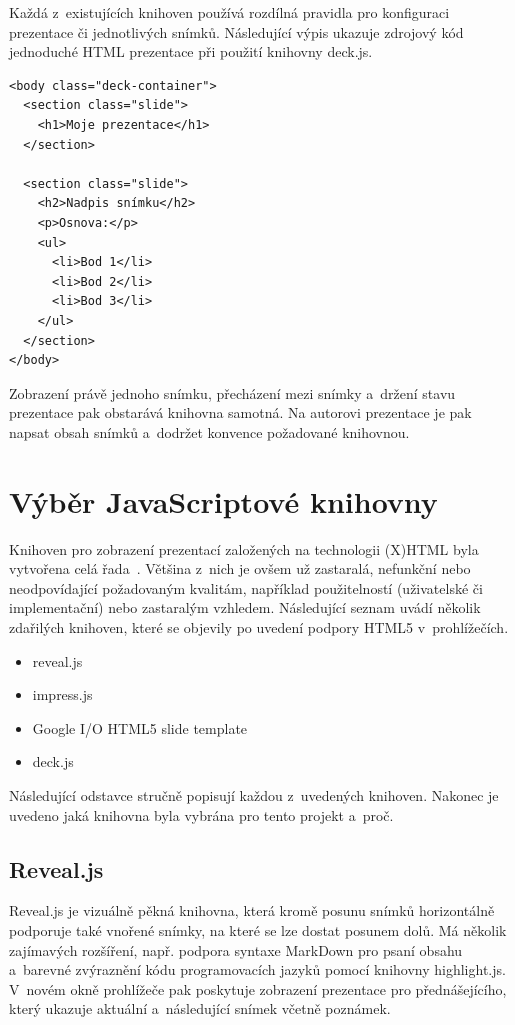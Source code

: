 \documentclass[11pt,twoside,a4paper]{book}
\begin{document}
Každá z~existujících knihoven používá rozdílná pravidla pro konfiguraci prezentace či jednotlivých snímků. Následující výpis ukazuje zdrojový kód jednoduché HTML prezentace při použití knihovny deck.js.

\begin{lstlisting}[caption=Ukázka zdrojového kódu HTML prezentace (deck.js),captionpos=b]
<body class="deck-container">
  <section class="slide">
    <h1>Moje prezentace</h1>
  </section>

  <section class="slide">
    <h2>Nadpis snímku</h2>
    <p>Osnova:</p>
    <ul>
      <li>Bod 1</li>
      <li>Bod 2</li>
      <li>Bod 3</li>
    </ul>
  </section>
</body>
\end{lstlisting}

Zobrazení právě jednoho snímku, přecházení mezi snímky a~držení stavu prezentace pak obstarává knihovna samotná. Na autorovi prezentace je pak napsat obsah snímků a~dodržet konvence požadované knihovnou.


\section{Výběr Java\-Scriptové knihovny}
Knihoven pro zobrazení prezentací založených na technologii (X)HTML byla vytvořena celá řada~\cite{htmlslideshowweb}. Většina z~nich je ovšem už zastaralá, nefunkční nebo neodpovídající požadovaným kvalitám, například použitelností (uživatelské či imple\-mentační) nebo zastaralým vzhledem. Následující seznam uvádí několik zdařilých knihoven, které se objevily po uvedení podpory HTML5 v~prohlížečích.

\begin{itemize}
	\item reveal.js
	\item impress.js
	\item Google I/O HTML5 slide template
	\item deck.js
\end{itemize}

Následující odstavce stručně popisují každou z~uvedených knihoven. Nakonec je uvedeno jaká knihovna byla vybrána pro tento projekt a~proč.

\subsection{Reveal.js} \label{chap:revealjs}
Reveal.js \cite{revealjs} je vizuálně pěkná knihovna, která kromě posunu snímků horizontálně podporuje také vnořené snímky, na které se lze dostat posunem dolů. Má několik zajímavých rozšíření, např. podpora syntaxe Mark\-Down pro psaní obsahu a~barevné zvýraznění kódu programovacích jazyků pomocí knihovny highlight.js. V~novém okně prohlížeče pak poskytuje zobrazení prezentace pro přednášejícího, který ukazuje aktuální a~následující snímek včetně poznámek.
\end{document}
